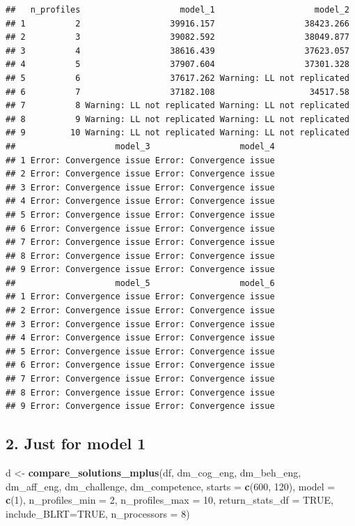 \documentclass[]{msu-thesis}
\newenvironment{Shaded}{\begin{snugshade}}{\end{snugshade}}
\newcommand{\KeywordTok}[1]{\textcolor[rgb]{0.13,0.29,0.53}{\textbf{#1}}}
\newcommand{\DataTypeTok}[1]{\textcolor[rgb]{0.13,0.29,0.53}{#1}}
\newcommand{\DecValTok}[1]{\textcolor[rgb]{0.00,0.00,0.81}{#1}}
\newcommand{\StringTok}[1]{\textcolor[rgb]{0.31,0.60,0.02}{#1}}
\newcommand{\OtherTok}[1]{\textcolor[rgb]{0.56,0.35,0.01}{#1}}
\newcommand{\NormalTok}[1]{#1}
\theoremstyle{definition}
\theoremstyle{definition}
\theoremstyle{definition}
\theoremstyle{remark}
\begin{document}
\begin{verbatim}
##   n_profiles                    model_1                    model_2
## 1          2                  39916.157                  38423.266
## 2          3                  39082.592                  38049.877
## 3          4                  38616.439                  37623.057
## 4          5                  37907.604                  37301.328
## 5          6                  37617.262 Warning: LL not replicated
## 6          7                  37182.108                   34517.58
## 7          8 Warning: LL not replicated Warning: LL not replicated
## 8          9 Warning: LL not replicated Warning: LL not replicated
## 9         10 Warning: LL not replicated Warning: LL not replicated
##                    model_3                  model_4
## 1 Error: Convergence issue Error: Convergence issue
## 2 Error: Convergence issue Error: Convergence issue
## 3 Error: Convergence issue Error: Convergence issue
## 4 Error: Convergence issue Error: Convergence issue
## 5 Error: Convergence issue Error: Convergence issue
## 6 Error: Convergence issue Error: Convergence issue
## 7 Error: Convergence issue Error: Convergence issue
## 8 Error: Convergence issue Error: Convergence issue
## 9 Error: Convergence issue Error: Convergence issue
##                    model_5                  model_6
## 1 Error: Convergence issue Error: Convergence issue
## 2 Error: Convergence issue Error: Convergence issue
## 3 Error: Convergence issue Error: Convergence issue
## 4 Error: Convergence issue Error: Convergence issue
## 5 Error: Convergence issue Error: Convergence issue
## 6 Error: Convergence issue Error: Convergence issue
## 7 Error: Convergence issue Error: Convergence issue
## 8 Error: Convergence issue Error: Convergence issue
## 9 Error: Convergence issue Error: Convergence issue
\end{verbatim}

\subsection{2. Just for model 1}\label{just-for-model-1}

\begin{Shaded}
\begin{Highlighting}[]
\NormalTok{d <-}\StringTok{ }\KeywordTok{compare_solutions_mplus}\NormalTok{(df,  }
\NormalTok{                             dm_cog_eng, dm_beh_eng, dm_aff_eng, dm_challenge, dm_competence,}
                             \DataTypeTok{starts =} \KeywordTok{c}\NormalTok{(}\DecValTok{600}\NormalTok{, }\DecValTok{120}\NormalTok{),}
                             \DataTypeTok{model =} \KeywordTok{c}\NormalTok{(}\DecValTok{1}\NormalTok{),}
                             \DataTypeTok{n_profiles_min =} \DecValTok{2}\NormalTok{, }
                             \DataTypeTok{n_profiles_max =} \DecValTok{10}\NormalTok{,}
                             \DataTypeTok{return_stats_df =} \OtherTok{TRUE}\NormalTok{,}
                             \DataTypeTok{include_BLRT=}\OtherTok{TRUE}\NormalTok{,}
                             \DataTypeTok{n_processors =} \DecValTok{8}\NormalTok{)}
\end{Highlighting}
\end{Shaded}
\end{document}
